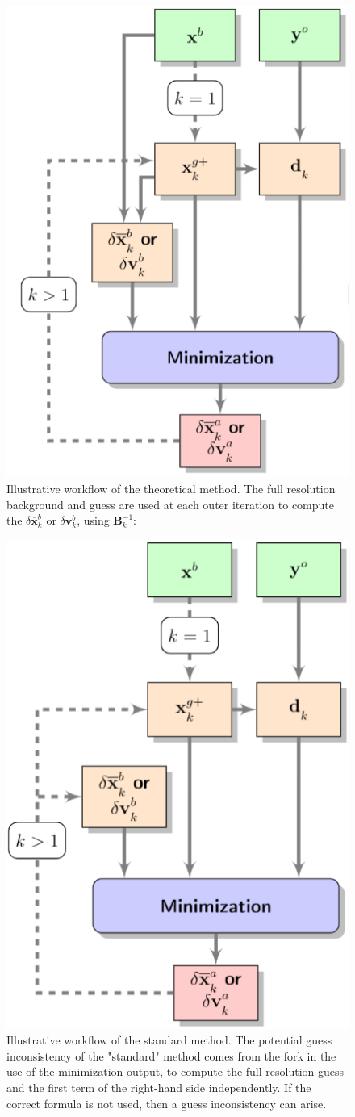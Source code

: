 \documentclass[npg, manuscript]{copernicus}
\begin{document}
\begin{figure}[H]
 \begin{center}
  \includegraphics[width=0.3\linewidth]{fig/th.png}
  \caption{\label{fig01} Illustrative workflow of the theoretical method. The full resolution background and guess are used at each outer iteration to compute the $\delta \overline{\mathbf{x}}^b_k$ or $\delta \mathbf{v}^b_k$, using $\mathbf{B}_k^{-1}$:}
 \end{center}
\end{figure}

\begin{figure}[H]
 \begin{center}
  \includegraphics[width=0.3\linewidth]{fig/std.png}
  \caption{\label{fig02} Illustrative workflow of the standard method. The potential guess inconsistency of the "standard" method comes from the fork in the use of the minimization output, to compute the full resolution guess and the first term of the right-hand side independently. If the correct formula is not used, then a guess inconsistency can arise.}
 \end{center}
\end{figure}
\end{document}
